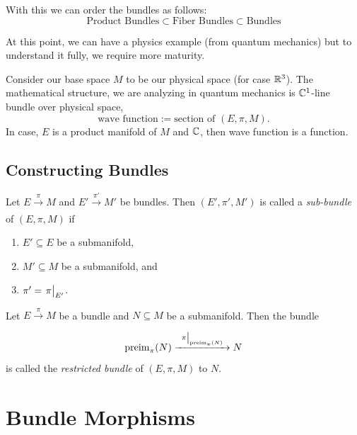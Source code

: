\noindent With this we can order the bundles as follows:
\begin{equation}
	\text{Product Bundles} \subset \text{Fiber Bundles} \subset \text{Bundles}
\end{equation}

At this point, we can have a physics example (from quantum mechanics) but to understand it fully, we require more maturity.
\begin{example}
	Consider our base space \(M\) to be our physical space (for case \(\mathbb R^3\)). The mathematical structure, we are analyzing in quantum mechanics is \(\mathbb C^1\)-line bundle over physical space,
	\begin{equation}
		\text{wave function} := \text{section of \((E, \pi, M)\)}.
	\end{equation}
	In case, \(E\) is a product manifold of \(M\) and \(\mathbb C\), then wave function is a function.
\end{example}

\subsection{Constructing Bundles}

\begin{definition}
	Let \(E \xrightarrow[]{\ \pi\ } M\) and \(E' \xrightarrow[]{\ \pi'\ } M'\) be bundles. Then \((E', \pi', M')\) is called a \emph{sub-bundle} of \((E, \pi, M)\) if
	\begin{enumerate}
		\item \(E' \subseteq E\) be a submanifold,
		\item \(M' \subseteq M\) be a submanifold, and
		\item \(\pi' = \eval{\pi}_{E'}\).
	\end{enumerate}
\end{definition}

\begin{definition}
	Let \(E \xrightarrow[]{\ \pi\ } M\) be a bundle and \(N \subseteq M\) be a submanifold. Then the bundle
	\begin{equation}
		\preimg_{\pi}(N) \xrightarrow[]{\ \eval{\pi}_{\preimg_{\pi}(N)}\ } N
	\end{equation}
	is called the \emph{restricted bundle} of \((E, \pi, M)\) to \(N\).
\end{definition}

\section{Bundle Morphisms}

